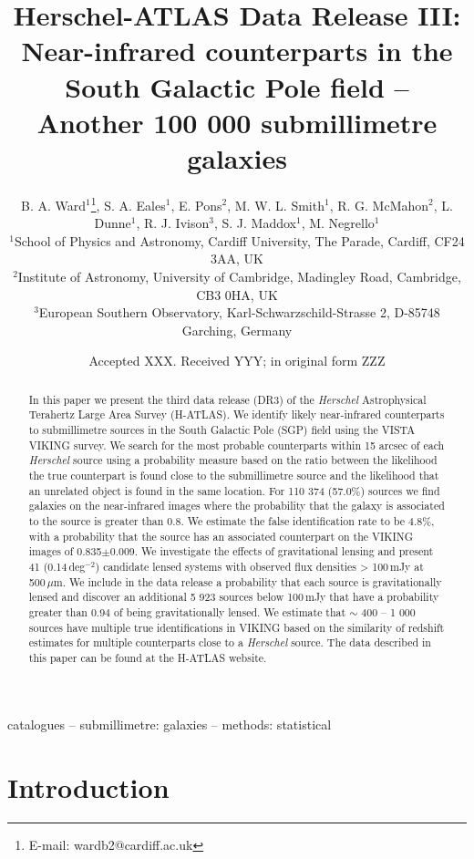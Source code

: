 \documentclass[fleqn,usenatbib]{mnras}
\title[Herschel-ATLAS Data Release 3]{Herschel-ATLAS Data Release III: Near-infrared counterparts in the South Galactic Pole field -- Another 100 000 submillimetre galaxies}
\author[B. A. Ward et al.]{
B. A. Ward$^{1}$\thanks{E-mail: wardb2@cardiff.ac.uk},
S. A. Eales$^{1}$,
E. Pons$^{2}$,
M. W. L. Smith$^{1}$,
R. G. McMahon$^{2}$,
L. Dunne$^{1}$,
R. J. Ivison$^{3}$,
\newauthor
S. J. Maddox$^{1}$,
M. Negrello$^{1}$
\\
$^{1}$School of Physics and Astronomy, Cardiff University, The Parade, Cardiff, CF24 3AA, UK\\
$^{2}$Institute of Astronomy, University of Cambridge, Madingley Road, Cambridge, CB3 0HA, UK\\
$^{3}$European Southern Observatory, Karl-Schwarzschild-Strasse 2, D-85748 Garching, Germany
}
\date{Accepted XXX. Received YYY; in original form ZZZ}
\begin{document}
\label{firstpage}
\pagerange{\pageref{firstpage}--\pageref{lastpage}}
\maketitle

\begin{abstract}
In this paper we present the third data release (DR3) of the \textit{Herschel} Astrophysical Terahertz Large Area Survey (H-ATLAS). We identify likely near-infrared counterparts to submillimetre sources in the South Galactic Pole (SGP) field using the VISTA VIKING survey. We search for the most probable counterparts within 15 arcsec of each \textit{Herschel} source using a probability measure based on the ratio between the likelihood the true counterpart is found close to the submillimetre source and the likelihood that an unrelated object is found in the same location. For 110 374 (57.0\%) sources we find galaxies on the near-infrared images where the probability that the galaxy is associated to the source is greater than 0.8. We estimate the false identification rate to be 4.8\%, with a probability that the source has an associated counterpart on the VIKING images of 0.835$\pm$0.009. We investigate the effects of gravitational lensing and present 41 (0.14\,deg$^{-2}$) candidate lensed systems with observed flux densities > 100\,mJy at 500\,$\mu$m. We include in the data release a probability that each source is gravitationally lensed and discover an additional 5 923 sources below 100\,mJy that have a probability greater than 0.94 of being gravitationally lensed. We estimate that $\sim$ 400 -- 1 000 sources have multiple true identifications in VIKING based on the similarity of redshift estimates for multiple counterparts close to a \textit{Herschel} source. The data described in this paper can be found at the H-ATLAS website.
\end{abstract}

\begin{keywords}
catalogues -- submillimetre: galaxies -- methods: statistical
\end{keywords}


\section{Introduction}
\label{sec:intro}
\end{document}

